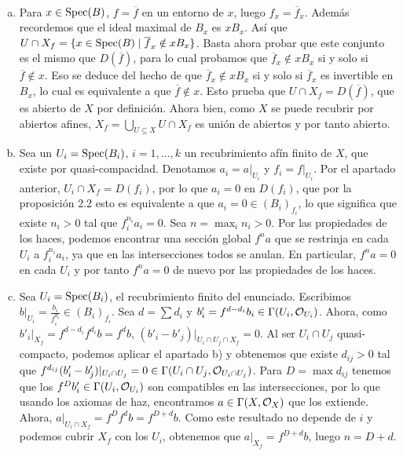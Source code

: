 \documentclass[twoside]{article}
\begin{document}
\begin{solucion}\
\begin{enumerate}[(a)]
\item Para $x\in\operatorname{Spec}(B)$, $f=\overline{f}$ en un entorno de $x$, luego $f_x=\overline{f}_x$. Además recordemos que el ideal maximal de $B_x$ es $xB_x$. Así que $U\cap X_f=\{x\in\operatorname{Spec}(B)\mid\overline{f}_x\notin xB_x\}$. Basta ahora probar que este conjunto es el mismo que $D(\overline{f})$, para lo cual probamos que $\overline{f}_x\notin xB_x$ si y solo si $\overline{f}\notin x$. Eso se deduce del hecho de que $\overline{f}_x\notin xB_x$ si y solo si $\overline{f}_x$ es invertible en $B_x$, lo cual es equivalente a que $\overline{f}\notin x$. Esto prueba que $U\cap X_f=D(\overline{f})$, que es abierto de $X$ por definición. Ahora bien, como $X$ se puede recubrir por abiertos afines, $X_f=\bigcup_{U\subseteq X} U\cap X_f$ es unión de abiertos y por tanto abierto. 
\item Sea un $U_i=\operatorname{Spec}(B_i)$, $i=1,\dots, k$ un recubrimiento afín finito de $X$, que existe por quasi-compacidad. Denotamos $a_i=a|_{U_i}$ y $f_i=f|_{U_i}$. Por el apartado anterior, $U_i\cap X_f=D(f_i)$, por lo que $a_i=0$ en $D(f_i)$, que por la proposición 2.2 esto es equivalente a que $a_i=0\in (B_i)_{f_i}$, lo que significa que existe $n_i>0$ tal que $f_i^{n_i}a_i=0$. Sea $n=\max_i n_i>0$. Por las propiedades de los haces, podemos encontrar una sección global $f^na$ que se restrinja en cada $U_i$ a $f_i^{n_i}a_i$, ya que en las intersecciones todos se anulan. En particular, $f^na=0$ en cada $U_i$ y por tanto $f^na=0$ de nuevo por las propiedades de los haces. 

\item Sea $U_i=\operatorname{Spec}(B_i)$, el recubrimiento finito del enunciado. Escribimos $b|_{U_i}=\frac{b_i}{f_i^{d_i}}\in (B_i)_{f_i}$. Sea $d=\sum d_i$ y $b_i'=f^{d-d_i}b_i\in\Gamma(U_i,{\mathcal O}_{U_i})$. Ahora, como $b'_i|_{X_f}=f^{d-d_i}f^{d_i}b=f^db$, $(b'_i-b'_j)|_{U_i\cap U_j\cap X_f}=0$. Al ser $U_i\cap U_j$ quasi-compacto, podemos aplicar el apartado b) y obtenemos que existe $d_{ij}>0$ tal que $f^{d_{ij}}(b'_i-b'_j)|_{U_i\cap U_j}=0\in\Gamma(U_i\cap U_j,{\mathcal O}_{U_i\cap U_j})$. Para $D=\max d_{ij}$ tenemos que los $f^Db_i'\in\Gamma(U_i,{\mathcal O}_{U_i})$ son compatibles en las intersecciones, por lo que usando los axiomas de haz, encontramos $a\in \Gamma(X, {\mathcal O}_X)$ que los extiende. Ahora, $a|_{U_i\cap X_f}=f^Df^db=f^{D+d}b$. Como este resultado no depende de $i$ y podemos cubrir $X_f$ con los $U_i$, obtenemos que $a|_{X_f}=f^{D+d}b$, luego $n=D+d$. 


\end{enumerate}
\end{solucion}
\end{document}
